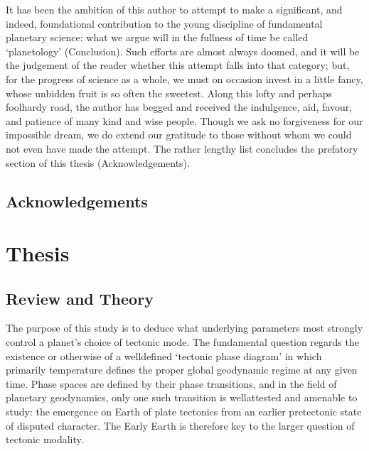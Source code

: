 \documentclass[letterpaper,10pt,english]{jupyterBook}
\begin{document}
\sphinxAtStartPar
It has been the ambition of this author to attempt to make a significant, and indeed, foundational contribution to the young discipline of fundamental planetary science: what we argue will in the fullness of time be called ‘planetology’ (Conclusion). Such efforts are almost always doomed, and it will be the judgement of the reader whether this attempt falls into that category; but, for the progress of science as a whole, we must on occasion invest in a little fancy, whose unbidden fruit is so often the sweetest. Along this lofty and perhaps foolhardy road, the author has begged and received the indulgence, aid, favour, and patience of many kind and wise people. Though we ask no forgiveness for our impossible dream, we do extend our gratitude to those without whom we could not even have made the attempt. The rather lengthy list concludes the prefatory section of this thesis (Acknowledgements).


\chapter{Acknowledgements}
\label{\detokenize{frontmatter/acknowledgements:acknowledgements}}\label{\detokenize{frontmatter/acknowledgements::doc}}

\part{Thesis}


\chapter{Review and Theory}
\label{\detokenize{content/chapter_01_background/main:review-and-theory}}\label{\detokenize{content/chapter_01_background/main::doc}}
\sphinxAtStartPar
The purpose of this study is to deduce what underlying parameters most strongly control a planet’s choice of tectonic mode. The fundamental question regards the existence or otherwise of a well\sphinxhyphen{}defined ‘tectonic phase diagram’ in which primarily temperature defines the proper global geodynamic regime at any given time. Phase spaces are defined by their phase transitions, and in the field of planetary geodynamics, only one such transition is well\sphinxhyphen{}attested and amenable to study: the emergence on Earth of plate tectonics from an earlier pre\sphinxhyphen{}tectonic state of disputed character. The Early Earth is therefore key to the larger question of tectonic modality.
\end{document}
